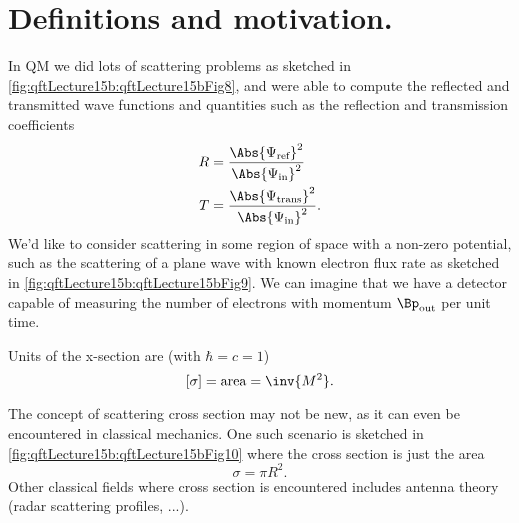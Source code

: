 %
%
\section{Definitions and motivation.}
In QM we did lots of scattering problems as sketched in \cref{fig:qftLecture15b:qftLecture15bFig8},
and were able to compute the reflected and transmitted wave functions and quantities such as the reflection and transmission coefficients
\begin{dmath}\label{eqn:qftLecture15b:440}
\begin{aligned}
R &= \frac
{\Abs{ \Psi_{\text{ref}}}^2}
{\Abs{ \Psi_{\text{in}}}^2} \\
T &= \frac
{\Abs{ \Psi_{\text{trans}}}^2}
{\Abs{ \Psi_{\text{in}}}^2}.
\end{aligned}
\end{dmath}
We'd like to consider scattering in some region of space with a non-zero potential, such as the scattering of a plane wave with known electron flux rate as sketched in
\cref{fig:qftLecture15b:qftLecture15bFig9}.
We can imagine that we have a detector capable of measuring the number of electrons with momentum \( \Bp_{\text{out}} \) per unit time.


Units of the x-section are (with \( \hbar = c = 1 \))
\begin{equation}\label{eqn:qftLecture15b:480}
[\sigma] = \text{area} = \inv{M^2}.
\end{equation}

The concept of scattering cross section may not be new, as it can even be encountered in classical mechanics.  One such scenario is sketched in \cref{fig:qftLecture15b:qftLecture15bFig10} where the cross section is just the area
\begin{dmath}\label{eqn:qftLecture15b:500}
\sigma = \pi R^2.
\end{dmath}
Other classical fields where cross section is encountered includes antenna theory (radar scattering profiles, ...).


